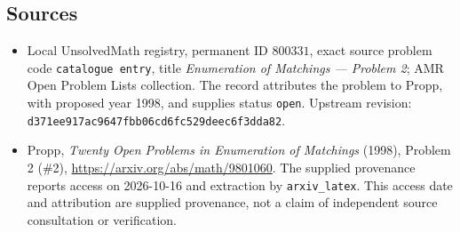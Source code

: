 \documentclass[11pt]{article}
\begin{document}
\subsection{Sources}
\begin{itemize}
\item Local UnsolvedMath registry, permanent ID \(800331\), exact source problem code \texttt{catalogue entry}, title \emph{Enumeration of Matchings --- Problem 2}; AMR Open Problem Lists collection. The record attributes the problem to Propp, with proposed year 1998, and supplies status \texttt{open}. Upstream revision: \texttt{d371ee917ac9647fbb06cd6fc529deec6f3dda82}.
\item Propp, \emph{Twenty Open Problems in Enumeration of Matchings} (1998), Problem 2 (\#2), \url{https://arxiv.org/abs/math/9801060}. The supplied provenance reports access on 2026-10-16 and extraction by \texttt{arxiv\_latex}. This access date and attribution are supplied provenance, not a claim of independent source consultation or verification.
\end{itemize}
\end{document}
